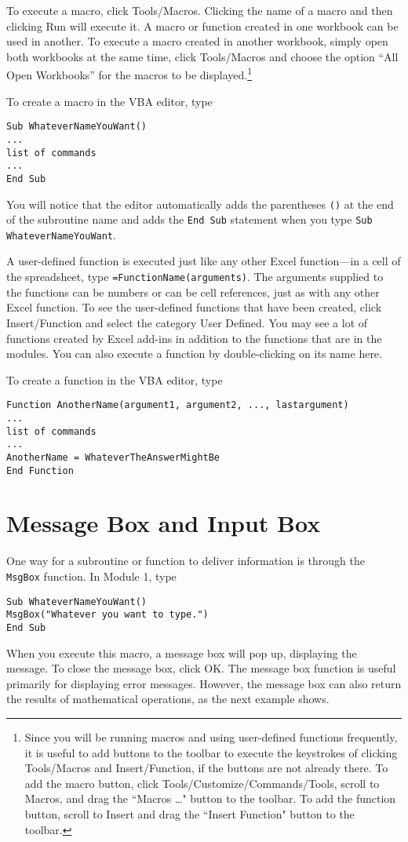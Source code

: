 To execute a macro, click Tools/Macros.  Clicking the name of a macro  and then clicking Run will execute it. A macro or function created in one workbook can be used in another.  To execute a macro created in another workbook, simply open both workbooks at the same time, click Tools/Macros and choose the option ``All Open Workbooks'' for the macros to be displayed.\footnote{Since you will be running macros and using user-defined functions frequently, it is useful to add buttons to the toolbar to execute the keystrokes of clicking Tools/Macros and Insert/Function, if the buttons are not already there.  To add the macro button, click Tools/Customize/Commands/Tools, scroll to Macros, and  drag the ``Macros \ldots" button to the toolbar.  To add the function button, scroll to Insert and  drag the ``Insert Function" button to the toolbar.} 

\vfil\eject
To create a macro in the VBA editor, type 
\small\begin{verbatim}
Sub WhateverNameYouWant()
...
list of commands
...
End Sub
\end{verbatim}\normalsize
You will notice that the editor automatically adds the parentheses \verb!()! at the end of the subroutine name and adds the \verb!End Sub! statement when you type \verb!Sub WhateverNameYouWant!.

A user-defined function is executed just like any other Excel function---in a cell of the spreadsheet, type  \verb!=FunctionName(arguments)!.  The arguments supplied to the functions can be numbers or can be cell references, just as with any other Excel function.
To see the user-defined functions that have been created, click Insert/Function and select the category User Defined.  You may see a lot of functions created by Excel add-ins in addition to the functions that are in the modules.  You can also execute a function by double-clicking on its name here.

To create a function in the VBA editor, type
\small\begin{verbatim}
Function AnotherName(argument1, argument2, ..., lastargument)
...
list of commands
...
AnotherName = WhateverTheAnswerMightBe
End Function
\end{verbatim}\normalsize



\section{Message Box and Input Box}
One way for a subroutine or function to deliver information is through the \verb!MsgBox! function.  In Module 1, type
\small\begin{verbatim}
Sub WhateverNameYouWant()
MsgBox("Whatever you want to type.")
End Sub
\end{verbatim}\normalsize
When you execute this macro, a message box will pop up, displaying the message.  To close the message box, click OK.  
The message box function is useful primarily for displaying error messages.    However, the message box can also return the results of mathematical operations, as the next example shows.
\vfil\eject

